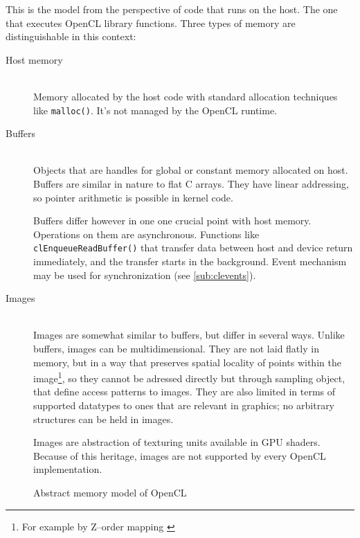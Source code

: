 This is the model from the perspective of code that runs on the host. The one
that executes OpenCL library functions. Three types of memory are distinguishable
in this context:

\begin{description}
  \item[Host memory] \hfill \\
    Memory allocated by the host code with standard allocation techniques
    like \texttt{malloc()}. It's not managed by the OpenCL runtime.
  \item[Buffers] \hfill \\
    Objects that are handles for global or constant memory allocated on host.
    Buffers are similar in nature to flat C arrays. They have linear addressing,
    so pointer arithmetic is possible in kernel code.

    Buffers differ however in one one crucial point with host memory. Operations
    on them are asynchronous. Functions like \texttt{clEnqueue\-Read\-Buffer()} that
    transfer data between host and device return immediately, and the transfer
    starts in the background. Event mechanism may be used for synchronization
    (see \autoref{sub:clevents}).
  \item[Images] \hfill \\
    Images are somewhat similar to buffers, but differ in several ways.
    Unlike buffers, images can be multidimensional. They are not laid flatly in
    memory, but in a way that preserves spatial locality of points within the
    image\footnote{For example by Z--order mapping \parencite[p. 111-113]{gaster2012heterogeneous}},
    so they cannot be adressed directly but through sampling object, that define
    access patterns to images. They are also limited in terms of supported
    datatypes to ones that are relevant in graphics; no arbitrary structures can
    be held in images.

    Images are abstraction of texturing units available in GPU shaders. Because
    of this heritage, images are not supported by every OpenCL implementation.

\end{description}
\begin{figure}[ht]
  \begin{center}
    
  \end{center}
  \caption{Abstract memory model of OpenCL \parencite{gaster2012heterogeneous}}
  \label{fig:clmemmodel}
\end{figure}
